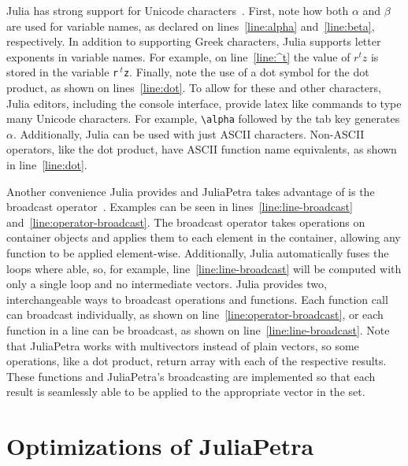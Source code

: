 \documentclass[acmsmall]{acmart}
\begin{document}
	
	Julia has strong support for Unicode characters~\cite{Bezanson:2017:FreshApproach}.
	First, note how both \(\alpha\) and \(\beta\) are used for variable names, as declared on lines~\ref{line:alpha} and~\ref{line:beta}, respectively.
	In addition to supporting Greek characters, Julia supports letter exponents in variable names.
	For example, on line~\ref{line:^t} the value of \(r^tz\) is stored in the variable \texttt{r$\,^t$z}. %
	Finally, note the use of a dot symbol for the dot product, as shown on lines~\ref{line:dot}.
	To allow for these and other characters, Julia editors, including the console interface, provide latex like commands to type many Unicode characters.
	For example, \texttt{\textbackslash alpha} followed by the tab key generates \(\alpha\).
	Additionally, Julia can be used with just ASCII characters.
	Non-ASCII operators, like the dot product, have ASCII function name equivalents, as shown in line~\ref{line:dot}.
	
	Another convenience Julia provides and JuliaPetra takes advantage of is the broadcast operator~\cite{Bezanson:2017:FreshApproach}.
	Examples can be seen in lines~\ref{line:line-broadcast} and~\ref{line:operator-broadcast}.
	The broadcast operator takes operations on container objects and applies them to each element in the container, allowing any function to be applied element-wise.
	Additionally, Julia automatically fuses the loops where able, so, for example, line~\ref{line:line-broadcast} will be computed with only a single loop and no intermediate vectors.
	Julia provides two, interchangeable ways to broadcast operations and functions.
	Each function call can broadcast individually, as shown on line~\ref{line:operator-broadcast}, or each function in a line can be broadcast, as shown on line~\ref{line:line-broadcast}.
	Note that JuliaPetra works with multivectors instead of plain vectors, so some operations, like a dot product, return array with each of the respective results.
	These functions and JuliaPetra's broadcasting are implemented so that each result is seamlessly able to be applied to the appropriate vector in the set.
	
	\section{Optimizations of JuliaPetra}
	
\end{document}
